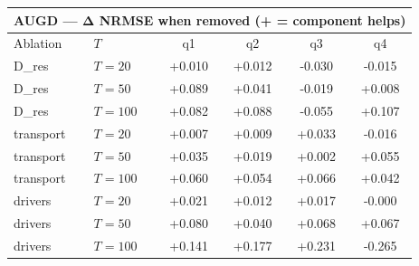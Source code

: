 \begin{tabular}{llcccc}
\toprule
\multicolumn{6}{c}{AUGD — Δ NRMSE when removed (+ = component helps)} \\
\midrule
Ablation & $T$ & q1 & q2 & q3 & q4 \\
\midrule
D_res & $T{=}20$ & +0.010 & +0.012 & -0.030 & -0.015 \\
D_res & $T{=}50$ & +0.089 & +0.041 & -0.019 & +0.008 \\
D_res & $T{=}100$ & +0.082 & +0.088 & -0.055 & +0.107 \\
transport & $T{=}20$ & +0.007 & +0.009 & +0.033 & -0.016 \\
transport & $T{=}50$ & +0.035 & +0.019 & +0.002 & +0.055 \\
transport & $T{=}100$ & +0.060 & +0.054 & +0.066 & +0.042 \\
drivers & $T{=}20$ & +0.021 & +0.012 & +0.017 & -0.000 \\
drivers & $T{=}50$ & +0.080 & +0.040 & +0.068 & +0.067 \\
drivers & $T{=}100$ & +0.141 & +0.177 & +0.231 & -0.265 \\
\bottomrule
\end{tabular}